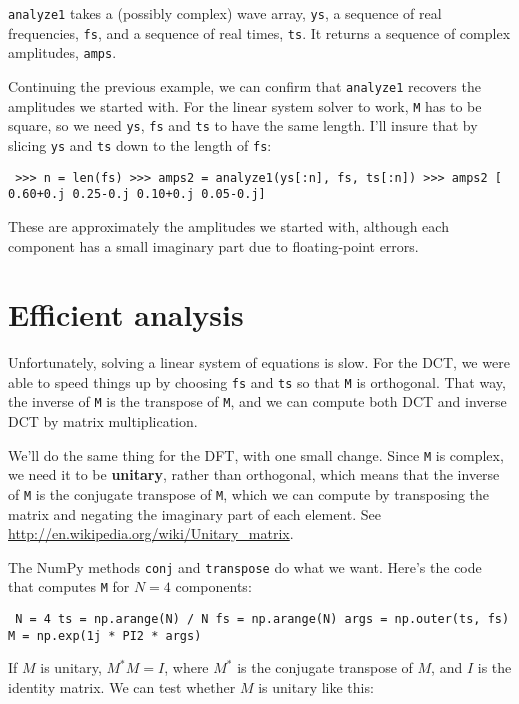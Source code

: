 \documentclass[12pt]{book} \usepackage[width=5.5in,height=8.5in, hmarginratio=3:2,vmarginratio=1:1]{geometry}
\begin{document}
{\tt analyze1} takes a (possibly complex) wave array, {\tt ys}, a sequence of real frequencies, {\tt fs}, and a sequence of real times, {\tt ts}. It returns a sequence of complex amplitudes, {\tt amps}. 

Continuing the previous example, we can confirm that {\tt analyze1} recovers the amplitudes we started with. For the linear system solver to work, {\tt M} has to be square, so we need {\tt ys}, {\tt fs} and {\tt ts} to have the same length. I'll insure that by slicing {\tt ys} and {\tt ts} down to the length of {\tt fs}: 

\begin{verbatim} >>> n = len(fs) >>> amps2 = analyze1(ys[:n], fs, ts[:n]) >>> amps2 [ 0.60+0.j 0.25-0.j 0.10+0.j 0.05-0.j] \end{verbatim} 

These are approximately the amplitudes we started with, although each component has a small imaginary part due to floating-point errors. 

\section{Efficient analysis} 

Unfortunately, solving a linear system of equations is slow. For the DCT, we were able to speed things up by choosing {\tt fs} and {\tt ts} so that {\tt M} is orthogonal. That way, the inverse of {\tt M} is the transpose of {\tt M}, and we can compute both DCT and inverse DCT by matrix multiplication. 

We'll do the same thing for the DFT, with one small change. Since {\tt M} is complex, we need it to be {\bf unitary}, rather than orthogonal, which means that the inverse of {\tt M} is the conjugate transpose of {\tt M}, which we can compute by transposing the matrix and negating the imaginary part of each element. See \url{http://en.wikipedia.org/wiki/Unitary_matrix}. 

The NumPy methods {\tt conj} and {\tt transpose} do what we want. Here's the code that computes {\tt M} for $N=4$ components: 

\begin{verbatim} N = 4 ts = np.arange(N) / N fs = np.arange(N) args = np.outer(ts, fs) M = np.exp(1j * PI2 * args) \end{verbatim} 

If $M$ is unitary, $M^*M = I$, where $M^*$ is the conjugate transpose of $M$, and $I$ is the identity matrix. We can test whether $M$ is unitary like this: 
\end{document}
